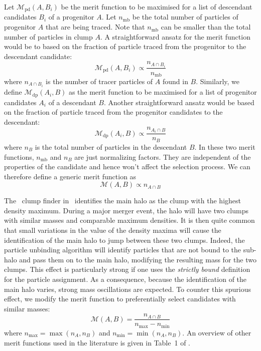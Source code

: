 Let $\mathcal{M}_{\mathrm{pd}}(A,B_i)$ be the merit function to be
maximised for a list of descendant candidates $B_i$ of a progenitor
$A$. Let $n_{\mathrm{mb}}$ be the total number of particles of progenitor
$A$ that are being traced. Note that $n_{\mathrm{mb}}$ can be smaller than the
total number of particles in clump $A$.  A straightforward ansatz for
the merit function would be to based on the fraction of particle traced from the
progenitor to the descendant candidate:
\begin{equation}
\mathcal{M}_{\mathrm{pd}}(A,B_i) \propto \frac{n_{A \cap B_i}}{n_{\mathrm{mb}}}
\end{equation}
where $n_{A \cap B_i}$ is the number of tracer particles of $A$ found
in $B$.  Similarly, we define $\mathcal{M}_{\mathrm{dp}}(A_i,B)$ as the
merit function to be maximised for a list of progenitor candidates
$A_i$ of a descendant $B$. Another straightforward ansatz would be
based on the fraction of particle traced from the progenitor
candidates to the descendant:
\begin{equation}
\mathcal{M}_{\mathrm{dp}}(A_i,B) \propto \frac{n_{A_i \cap B}}{n_B}
\end{equation}
where $n_B$ is the total number of particles in the descendant $B$.
In these two merit functions, $n_{\mathrm{mb}}$ and $n_B$ are just
normalizing factors. They are independent of the properties of the
candidate and hence won't affect the selection process.  We can
therefore define a generic merit function as
\begin{equation}
\mathcal{M}(A,B) \propto n_{A \cap B}
\end{equation}

The \phew\ clump finder in \ramses\ identifies the main halo as the
clump with the highest density maximum.  During a major merger event,
the halo will have two clumps with similar masses and comparable
maximum densities.  It is then quite common that small variations in
the value of the density maxima will cause the identification of the
main halo to jump between these two clumps.  Indeed, the particle
unbinding algorithm will identify particles that are not bound to the
sub-halo and pass them on to the main halo, modifying the resulting
mass for the two clumps.  This effect is particularly strong if one
uses the \emph{strictly bound} definition for the particle
assignment. As a consequence, because the identification of the main
halo varies, strong mass oscillations are expected. To counter this
spurious effect, we modify the merit function to preferentially select candidates with similar masses:
\begin{equation}
\mathcal{M}(A,B) = \frac{n_{A \cap B}}{n_{\mathrm{max}} - n_{\mathrm{min}}} \label{eq:merit}
\end{equation}
where $n_{\mathrm{max}}=\max(n_A,n_B)$ and $n_{\mathrm{min}}=\min(n_A,n_B)$.  An
overview of other merit functions used in the literature is given in
Table~1 of \cite{SUSSING_COMPARISON}.




